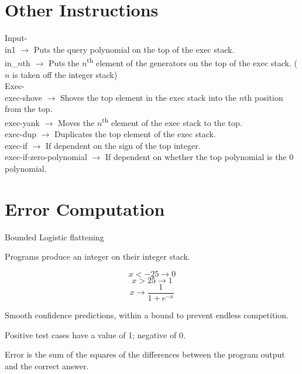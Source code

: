 \documentclass[20pt]{extarticle}
\begin{document}
\newpage
\section*{Other Instructions}

\noindent Input- \\
\indent in1 $\rightarrow$ Puts the query polynomial on the top of the exec stack. \\
\indent in\_$n$th $\rightarrow$ Puts the $n$\textsuperscript{th} element of the generators on the top of the exec stack. ($n$ is taken off the integer stack) \\

\noindent Exec- \\
\indent exec-shove $\rightarrow$ Shoves the top element in the exec stack into the $n$th position from the top. \\
\indent exec-yank $\rightarrow$ Moves the $n$\textsuperscript{th} element of the exec stack to the top. \\
\indent exec-dup $\rightarrow$ Duplicates the top element of the exec stack. \\
\indent exec-if $\rightarrow$ If dependent on the sign of the top integer. \\
\indent exec-if-zero-polynomial $\rightarrow$ If dependent on whether the top polynomial is the 0 polynomial. \\

\newpage
\section*{Error Computation}

\noindent Bounded Logistic flattening

\noindent Programs produce an integer on their integer stack. 

 $$x < -25 \rightarrow 0 $$
 $$x > 25  \rightarrow 1 $$
 $$x \rightarrow \frac{1}{1+e^{-x}}$$

\noindent Smooth confidence predictions, within a bound to prevent endless competition. 

\noindent Positive test cases have a value of 1; negative of 0.

\noindent Error is the sum of the squares of the differences between the program output and the correct answer.

\end{document}
